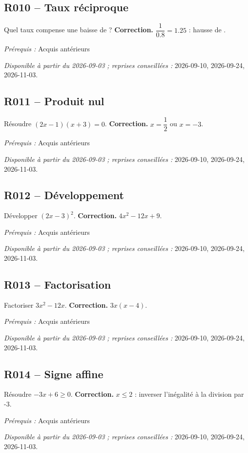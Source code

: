 \subsection*{R010 -- Taux réciproque}\label{R010}
Quel taux compense une baisse de  ?
\ifmxteacher\textbf{Correction.} $\dfrac{1}{\num{0,8}}=\num{1,25}$ : hausse de .\par\textit{Prérequis :} Acquis antérieurs\par\textit{Disponible à partir du 2026-09-03 ; reprises conseillées :} 2026-09-10, 2026-09-24, 2026-11-03.\fi
{}\subsection*{R011 -- Produit nul}\label{R011}
Résoudre $(2x-1)(x+3)=0$.
\ifmxteacher\textbf{Correction.} $x=\dfrac{1}{2}$ ou $x=-3$.\par\textit{Prérequis :} Acquis antérieurs\par\textit{Disponible à partir du 2026-09-03 ; reprises conseillées :} 2026-09-10, 2026-09-24, 2026-11-03.\fi
{}\subsection*{R012 -- Développement}\label{R012}
Développer $(2x-3)^2$.
\ifmxteacher\textbf{Correction.} $4x^2-12x+9$.\par\textit{Prérequis :} Acquis antérieurs\par\textit{Disponible à partir du 2026-09-03 ; reprises conseillées :} 2026-09-10, 2026-09-24, 2026-11-03.\fi
{}\subsection*{R013 -- Factorisation}\label{R013}
Factoriser $3x^2-12x$.
\ifmxteacher\textbf{Correction.} $3x(x-4)$.\par\textit{Prérequis :} Acquis antérieurs\par\textit{Disponible à partir du 2026-09-03 ; reprises conseillées :} 2026-09-10, 2026-09-24, 2026-11-03.\fi
{}\subsection*{R014 -- Signe affine}\label{R014}
Résoudre $-3x+6\geq0$.
\ifmxteacher\textbf{Correction.} $x\leq2$ : inverser l’inégalité à la division par -3.\par\textit{Prérequis :} Acquis antérieurs\par\textit{Disponible à partir du 2026-09-03 ; reprises conseillées :} 2026-09-10, 2026-09-24, 2026-11-03.\fi
